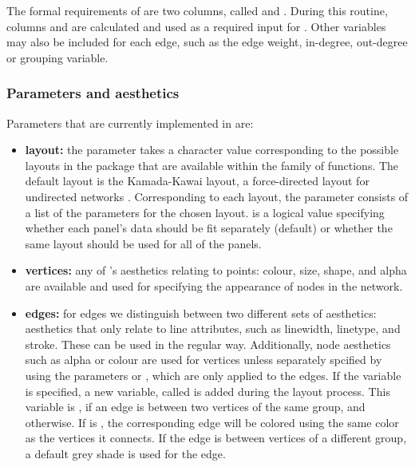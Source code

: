 The formal requirements of  are two columns, called  and . During this routine, columns  and  are calculated and used as a required input for .
%
Other variables may also be included for each edge, such as the edge weight, in-degree, out-degree or grouping variable.

\subsubsection{Parameters and aesthetics}

Parameters that are currently implemented in  are:

\begin{itemize}
\item {\bf layout:}
the  parameter takes a character value corresponding to the possible layouts in the  package that are available within the  family of functions.  The default layout is the Kamada-Kawai layout, a force-directed layout for undirected networks \citep{kamadakawai}.
Corresponding to each layout, the parameter   consists of a list of the parameters for the chosen layout.  is a logical value specifying whether each panel's data should be fit separately (default) or whether the same layout should be used for all of the panels.
\item {\bf vertices:} any of 's aesthetics relating to points: colour, size, shape, and alpha are available and used for specifying the appearance of nodes in the network.
%
\item {\bf edges:} for edges we distinguish between two different sets of aesthetics: aesthetics that only relate to line attributes, such as  linewidth, linetype, and stroke.  These can be used in the regular way.  Additionally, node aesthetics such as alpha or colour are used for vertices unless separately spcified by using the parameters  or , which are only applied to the edges. If the  variable is specified, a new variable, called  is added during the layout process. This variable is , if an edge is between two vertices of the same group, and  otherwise. If  is , the corresponding edge will be colored using the same color as the vertices it connects. If the edge is between vertices of a different group, a default grey shade is used for the edge.


\end{itemize}
